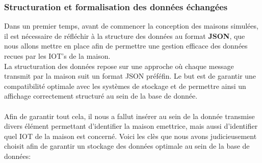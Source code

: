 \documentclass[10pt, a4paper]{report}
\begin{document}
	\subsubsection{Structuration et formalisation des données échangées}
	Dans un premier temps, avant de commencer la conception des maisons simulées, il est nécessaire de réfléchir à la structure des données au format \textbf{JSON}, que nous allons mettre en place afin de permettre une gestion efficace des données recues par les IOT's de la maison.\\
	La structuration des données repose sur une approche où chaque message transmit par la maison suit un format JSON préféfin. Le but est de garantir une compatibilité optimale avec les systèmes de stockage et de permettre ainsi un affichage correctement structuré au sein de la base de donnée.\\\\
	Afin de garantir tout cela, il nous a fallut insérer au sein de la donnée transmise divers élément permettant d'identifier la maison emettrice, mais aussi d'identifier quel IOT de la maison est concerné. Voici les clès que nous avons judicieusement choisit afin de garantir un stockage des données optimale au sein de la base de données:
\end{document}
